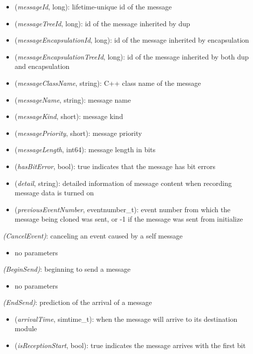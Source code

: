 \begin{itemize}
  \item {} (\textit{messageId}, long): lifetime-unique id of the message
  \item {} (\textit{messageTreeId}, long): id of the message inherited by dup
  \item {} (\textit{messageEncapsulationId}, long): id of the message inherited by encapsulation
  \item {} (\textit{messageEncapsulationTreeId}, long): id of the message inherited by both dup and encapsulation
  \item {} (\textit{messageClassName}, string): C++ class name of the message
  \item {} (\textit{messageName}, string): message name
  \item {} (\textit{messageKind}, short): message kind
  \item {} (\textit{messagePriority}, short): message priority
  \item {} (\textit{messageLength}, int64): message length in bits
  \item {} (\textit{hasBitError}, bool): true indicates that the message has bit errors
  \item {} (\textit{detail}, string): detailed information of message content when recording message data is turned on
  \item {} (\textit{previousEventNumber}, eventnumber\_t): event number from which the message being cloned was sent, or -1 if the message was sent from initialize
\end{itemize}

 \textit{(CancelEvent)}: canceling an event caused by a self message

\begin{itemize}
  \item no parameters
\end{itemize}

 \textit{(BeginSend)}: beginning to send a message

\begin{itemize}
  \item no parameters
\end{itemize}

 \textit{(EndSend)}: prediction of the arrival of a message

\begin{itemize}
  \item {} (\textit{arrivalTime}, simtime\_t): when the message will arrive to its destination module
  \item {} (\textit{isReceptionStart}, bool): true indicates the message arrives with the first bit
\end{itemize}

